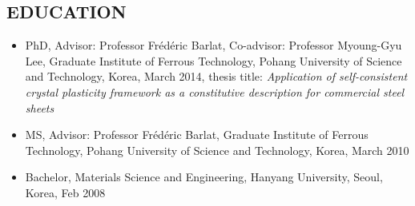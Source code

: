\documentclass{res}
\begin{document}
\begin{resume}
  \section{EDUCATION}
  \begin{itemize}
  \item PhD, Advisor: Professor Fr\'ed\'eric Barlat, Co-advisor: Professor Myoung-Gyu Lee, Graduate Institute of Ferrous Technology, Pohang University of Science and Technology, Korea, March 2014,
    thesis title: {\it Application of self-consistent crystal plasticity framework as a constitutive description for commercial steel sheets}
  \item MS, Advisor: Professor Fr\'ed\'eric Barlat, Graduate Institute of Ferrous Technology, Pohang University of Science and Technology, Korea, March 2010
  \item Bachelor, Materials Science and Engineering, Hanyang University, Seoul, Korea, Feb 2008
  \end{itemize}


\end{resume}
\end{document}

